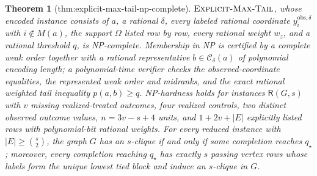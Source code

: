 \documentclass{article}
\newtheorem{theorem}{Theorem}
\begin{document}
\begin{theorem}[thm:explicit-max-tail-np-complete]\label{thm:explicit-max-tail-np-complete}
\(\textsc{Explicit-Max-Tail}\), whose encoded instance consists of \(a\), a rational \(\delta\), every labeled rational coordinate \(y_i^{\mathrm{obs},\delta}\) with \(i\notin M(a)\), the support \(\Omega\) listed row by row, every rational weight \(w_z\), and a rational threshold \(q\), is NP-complete. Membership in NP is certified by a complete weak order together with a rational representative \(b\in\mathcal C_\delta(a)\) of polynomial encoding length; a polynomial-time verifier checks the observed-coordinate equalities, the represented weak order and midranks, and the exact rational weighted tail inequality \(p(a,b)\ge q\). NP-hardness holds for instances \(\mathsf R(G,s)\) with \(v\) missing realized-treated outcomes, four realized controls, two distinct observed outcome values, \(n=3v-s+4\) units, and \(1+2v+|E|\) explicitly listed rows with polynomial-bit rational weights. For every reduced instance with \(|E|\ge\binom{s}{2}\), the graph \(G\) has an \(s\)-clique if and only if some completion reaches \(q_\star\); moreover, every completion reaching \(q_\star\) has exactly \(s\) passing vertex rows whose labels form the unique lowest tied block and induce an \(s\)-clique in \(G\).
\end{theorem}
\end{document}
